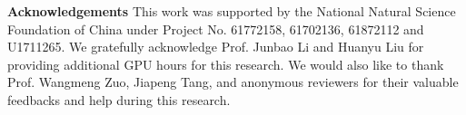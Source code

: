 \documentclass[10pt,twocolumn,letterpaper]{article}
\begin{document}
\noindent \textbf{Acknowledgements}
This work was supported by the National Natural Science Foundation of China under Project No. 61772158, 61702136, 61872112 and U1711265.
We gratefully acknowledge Prof. Junbao Li and Huanyu Liu for providing additional GPU hours for this research.
We would also like to thank Prof. Wangmeng Zuo, Jiapeng Tang, and anonymous reviewers for their valuable feedbacks and help during this research.

{\small


}
\end{document}

